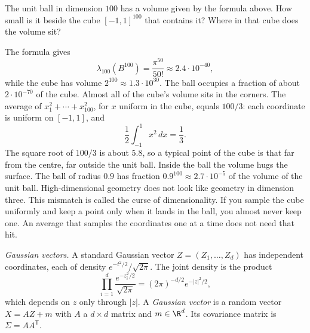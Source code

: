 \begin{think}
The unit ball in dimension $100$ has a volume given by the formula above. How small is it beside the cube $[-1,1]^{100}$ that contains it? Where in that cube does the volume sit?
\end{think}

The formula gives
\[
\lambda_{100}(B^{100})=\frac{\pi^{50}}{50!}\approx 2.4\cdot 10^{-40},
\]
while the cube has volume $2^{100}\approx 1.3\cdot 10^{30}$. The ball occupies a fraction of about $2\cdot 10^{-70}$ of the cube. Almost all of the cube's volume sits in the corners. The average of $x_1^2+\cdots+x_{100}^2$, for $x$ uniform in the cube, equals $100/3$: each coordinate is uniform on $[-1,1]$, and
\[
\frac12\int_{-1}^1 x^2\,dx=\frac13.
\]
The square root of $100/3$ is about $5.8$, so a typical point of the cube is that far from the centre, far outside the unit ball. Inside the ball the volume hugs the surface. The ball of radius $0.9$ has fraction $0.9^{100}\approx 2.7\cdot 10^{-5}$ of the volume of the unit ball. High-dimensional geometry does not look like geometry in dimension three. This mismatch is called the curse of dimensionality. If you sample the cube uniformly and keep a point only when it lands in the ball, you almost never keep one. An average that samples the coordinates one at a time does not need that hit.

\emph{Gaussian vectors.} A standard Gaussian vector $Z=(Z_1,\dots,Z_d)$ has independent coordinates, each of density $e^{-t^2/2}/\sqrt{2\pi}$. The joint density is the product
\[
\prod_{i=1}^d\frac{e^{-z_i^2/2}}{\sqrt{2\pi}}=(2\pi)^{-d/2}e^{-|z|^2/2},
\]
which depends on $z$ only through $|z|$. A \emph{Gaussian vector} is a random vector $X=AZ+m$ with $A$ a $d\times d$ matrix and $m\in\R^d$. Its covariance matrix is $\Sigma=AA^{\mathsf T}$.

